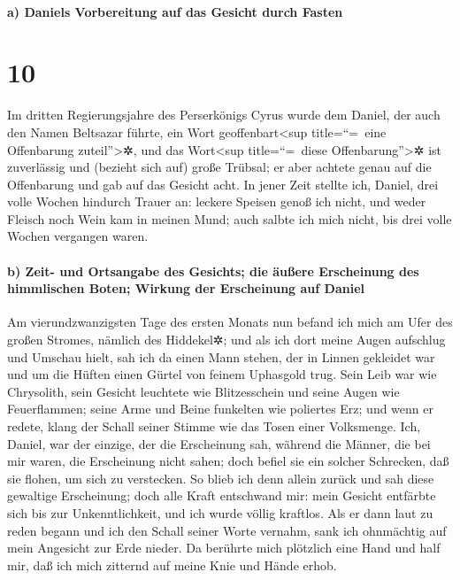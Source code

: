 \hypertarget{a-daniels-vorbereitung-auf-das-gesicht-durch-fasten}{%
\paragraph{a) Daniels Vorbereitung auf das Gesicht durch
Fasten}\label{a-daniels-vorbereitung-auf-das-gesicht-durch-fasten}}

\hypertarget{section-9}{%
\section{10}\label{section-9}}

Im dritten Regierungsjahre des Perserkönigs Cyrus wurde
dem Daniel, der auch den Namen Beltsazar führte, ein Wort
geoffenbart\textless sup title=``=~eine Offenbarung
zuteil''\textgreater✲, und das Wort\textless sup title=``=~diese
Offenbarung''\textgreater✲ ist zuverlässig und (bezieht sich auf) große
Trübsal; er aber achtete genau auf die Offenbarung und gab auf das
Gesicht acht. In jener Zeit stellte ich, Daniel, drei
volle Wochen hindurch Trauer an: leckere Speisen genoß ich
nicht, und weder Fleisch noch Wein kam in meinen Mund; auch salbte ich
mich nicht, bis drei volle Wochen vergangen waren.

\hypertarget{b-zeit--und-ortsangabe-des-gesichts-die-uxe4uuxdfere-erscheinung-des-himmlischen-boten-wirkung-der-erscheinung-auf-daniel}{%
\paragraph{b) Zeit- und Ortsangabe des Gesichts; die äußere Erscheinung
des himmlischen Boten; Wirkung der Erscheinung auf
Daniel}\label{b-zeit--und-ortsangabe-des-gesichts-die-uxe4uuxdfere-erscheinung-des-himmlischen-boten-wirkung-der-erscheinung-auf-daniel}}

Am vierundzwanzigsten Tage des ersten Monats nun befand
ich mich am Ufer des großen Stromes, nämlich des Hiddekel✲;
und als ich dort meine Augen aufschlug und Umschau hielt,
sah ich da einen Mann stehen, der in Linnen gekleidet war und um die
Hüften einen Gürtel von feinem Uphasgold trug. Sein Leib
war wie Chrysolith, sein Gesicht leuchtete wie Blitzesschein und seine
Augen wie Feuerflammen; seine Arme und Beine funkelten wie poliertes
Erz; und wenn er redete, klang der Schall seiner Stimme wie das Tosen
einer Volksmenge. Ich, Daniel, war der einzige, der die
Erscheinung sah, während die Männer, die bei mir waren, die Erscheinung
nicht sahen; doch befiel sie ein solcher Schrecken, daß sie flohen, um
sich zu verstecken. So blieb ich denn allein zurück und
sah diese gewaltige Erscheinung; doch alle Kraft entschwand mir: mein
Gesicht entfärbte sich bis zur Unkenntlichkeit, und ich wurde völlig
kraftlos. Als er dann laut zu reden begann und ich den
Schall seiner Worte vernahm, sank ich ohnmächtig auf mein Angesicht zur
Erde nieder. Da berührte mich plötzlich eine Hand und
half mir, daß ich mich zitternd auf meine Knie und Hände erhob.

